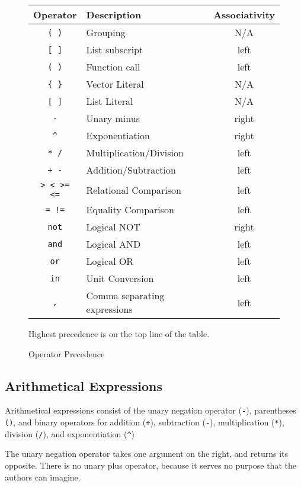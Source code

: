 \begin{figure}
\begin{tabular}{|c|l|c|} \hline
\bf Operator   & \bf Description     & \bf Associativity \\ \hline
\verb|( )| & Grouping        & N/A  \\ \hline
\id{}\verb|[ ]| & List subscript & left  \\ \hline
\id{}\verb|( )| & Function call & left \\ \hline
\verb|{ }| & Vector Literal & N/A \\ \hline
\verb|[ ]| & List Literal   & N/A \\ \hline
\verb|-|   & Unary minus     & right \\ \hline
\verb|^|   & Exponentiation  & right \\ \hline
\verb|* /| & Multiplication/Division & left \\ \hline
\verb|+ -| & Addition/Subtraction & left \\ \hline
\verb|> < >= <=| & Relational Comparison & left \\ \hline
\verb|= !=| & Equality Comparison & left \\ \hline
\verb|not| & Logical NOT & right \\ \hline
\verb|and| & Logical AND & left \\ \hline
\verb|or|  & Logical OR  & left \\ \hline
\verb|in|  & Unit Conversion & left \\ \hline
\verb|,|   & Comma separating expressions & left \\ \hline
\end{tabular}

Highest precedence is on the top line of the table.
\caption{Operator Precedence}
\label{precedence}
\end{figure}


\subsection{Arithmetical Expressions}

Arithmetical expressions consist of the unary negation operator
(\verb|-|), parentheses \verb|()|, and binary operators for addition
(\verb|+|), subtraction (\verb|-|), multiplication (\verb|*|),
division (\verb|/|), and exponentiation (\verb|^|)

The unary negation operator takes one argument on the right, and
returns its opposite.  There is no unary plus operator, because it
serves no purpose that the authors can imagine.

